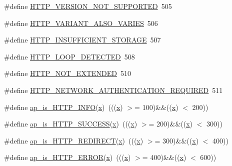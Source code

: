 \begin{DoxyCompactItemize}
\item 
\#define \hyperlink{group__HTTP__Status_ga5afac709466d3e236035fcb89a432098}{H\+T\+T\+P\+\_\+\+V\+E\+R\+S\+I\+O\+N\+\_\+\+N\+O\+T\+\_\+\+S\+U\+P\+P\+O\+R\+T\+ED}~505
\item 
\#define \hyperlink{group__HTTP__Status_gaeb2b4b66c2032ccd47cdc33a4fc09fbe}{H\+T\+T\+P\+\_\+\+V\+A\+R\+I\+A\+N\+T\+\_\+\+A\+L\+S\+O\+\_\+\+V\+A\+R\+I\+ES}~506
\item 
\#define \hyperlink{group__HTTP__Status_ga22f7047c07db7c74dc1b8574538ed7c8}{H\+T\+T\+P\+\_\+\+I\+N\+S\+U\+F\+F\+I\+C\+I\+E\+N\+T\+\_\+\+S\+T\+O\+R\+A\+GE}~507
\item 
\#define \hyperlink{group__HTTP__Status_gaf301ef6d2f55baf5dbdacdb9603bc8f7}{H\+T\+T\+P\+\_\+\+L\+O\+O\+P\+\_\+\+D\+E\+T\+E\+C\+T\+ED}~508
\item 
\#define \hyperlink{group__HTTP__Status_gafe1532ebc5bd48dbd10e55f33be2bdf7}{H\+T\+T\+P\+\_\+\+N\+O\+T\+\_\+\+E\+X\+T\+E\+N\+D\+ED}~510
\item 
\#define \hyperlink{group__HTTP__Status_gac319e16006402a28e6c3f66c3f142660}{H\+T\+T\+P\+\_\+\+N\+E\+T\+W\+O\+R\+K\+\_\+\+A\+U\+T\+H\+E\+N\+T\+I\+C\+A\+T\+I\+O\+N\+\_\+\+R\+E\+Q\+U\+I\+R\+ED}~511
\item 
\#define \hyperlink{group__HTTP__Status_ga66e040e5c6c5a494b7dd04f280e90274}{ap\+\_\+is\+\_\+\+H\+T\+T\+P\+\_\+\+I\+N\+FO}(\hyperlink{pcregrep_8txt_a4242e9148f20c002763bf4ba53b26ad6}{x})~(((\hyperlink{pcregrep_8txt_a4242e9148f20c002763bf4ba53b26ad6}{x}) $>$= 100)\&\&((\hyperlink{pcregrep_8txt_a4242e9148f20c002763bf4ba53b26ad6}{x}) $<$ 200))
\item 
\#define \hyperlink{group__HTTP__Status_gae0908ef87e454c3343bfe29be9e8d28b}{ap\+\_\+is\+\_\+\+H\+T\+T\+P\+\_\+\+S\+U\+C\+C\+E\+SS}(\hyperlink{pcregrep_8txt_a4242e9148f20c002763bf4ba53b26ad6}{x})~(((\hyperlink{pcregrep_8txt_a4242e9148f20c002763bf4ba53b26ad6}{x}) $>$= 200)\&\&((\hyperlink{pcregrep_8txt_a4242e9148f20c002763bf4ba53b26ad6}{x}) $<$ 300))
\item 
\#define \hyperlink{group__HTTP__Status_ga8cc5ef5e3fd1fe8b24f07f7db00d866c}{ap\+\_\+is\+\_\+\+H\+T\+T\+P\+\_\+\+R\+E\+D\+I\+R\+E\+CT}(\hyperlink{pcregrep_8txt_a4242e9148f20c002763bf4ba53b26ad6}{x})~(((\hyperlink{pcregrep_8txt_a4242e9148f20c002763bf4ba53b26ad6}{x}) $>$= 300)\&\&((\hyperlink{pcregrep_8txt_a4242e9148f20c002763bf4ba53b26ad6}{x}) $<$ 400))
\item 
\#define \hyperlink{group__HTTP__Status_ga8d68ab85112b05168201e4b827f69400}{ap\+\_\+is\+\_\+\+H\+T\+T\+P\+\_\+\+E\+R\+R\+OR}(\hyperlink{pcregrep_8txt_a4242e9148f20c002763bf4ba53b26ad6}{x})~(((\hyperlink{pcregrep_8txt_a4242e9148f20c002763bf4ba53b26ad6}{x}) $>$= 400)\&\&((\hyperlink{pcregrep_8txt_a4242e9148f20c002763bf4ba53b26ad6}{x}) $<$ 600))

\end{DoxyCompactItemize}

